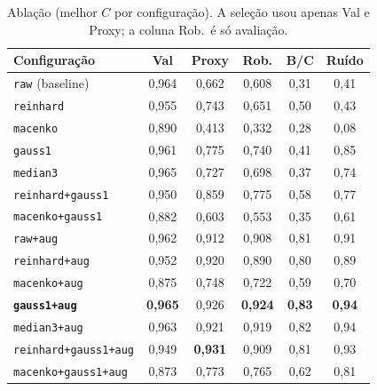 \documentclass[10pt,conference]{IEEEtran}
\newcommand{\cfg}[1]{\texttt{#1}}
\begin{document}
\begin{table}[t]
\centering
\caption{Ablação (melhor $C$ por configuração). A seleção usou apenas Val e Proxy; a coluna Rob.\ é só avaliação.}
\label{tab:abl}
\setlength{\tabcolsep}{4pt}
\begin{tabular}{lccc|cc}
\toprule
Configuração & Val & Proxy & Rob. & B/C & Ruído \\
\midrule
\cfg{raw} (baseline)      & 0,964 & 0,662 & 0,608 & 0,31 & 0,41 \\
\cfg{reinhard}            & 0,955 & 0,743 & 0,651 & 0,50 & 0,43 \\
\cfg{macenko}             & 0,890 & 0,413 & 0,332 & 0,28 & 0,08 \\
\cfg{gauss1}              & 0,961 & 0,775 & 0,740 & 0,41 & 0,85 \\
\cfg{median3}             & 0,965 & 0,727 & 0,698 & 0,37 & 0,74 \\
\cfg{reinhard+gauss1}     & 0,950 & 0,859 & 0,775 & 0,58 & 0,77 \\
\cfg{macenko+gauss1}      & 0,882 & 0,603 & 0,553 & 0,35 & 0,61 \\
\midrule
\cfg{raw+aug}             & 0,962 & 0,912 & 0,908 & 0,81 & 0,91 \\
\cfg{reinhard+aug}        & 0,952 & 0,920 & 0,890 & 0,80 & 0,89 \\
\cfg{macenko+aug}         & 0,875 & 0,748 & 0,722 & 0,59 & 0,70 \\
\textbf{\cfg{gauss1+aug}} & \textbf{0,965} & 0,926 & \textbf{0,924} & \textbf{0,83} & \textbf{0,94} \\
\cfg{median3+aug}         & 0,963 & 0,921 & 0,919 & 0,82 & 0,94 \\
\cfg{reinhard+gauss1+aug} & 0,949 & \textbf{0,931} & 0,909 & 0,81 & 0,93 \\
\cfg{macenko+gauss1+aug}  & 0,873 & 0,773 & 0,765 & 0,62 & 0,81 \\
\bottomrule
\end{tabular}
\end{table}
\end{document}
